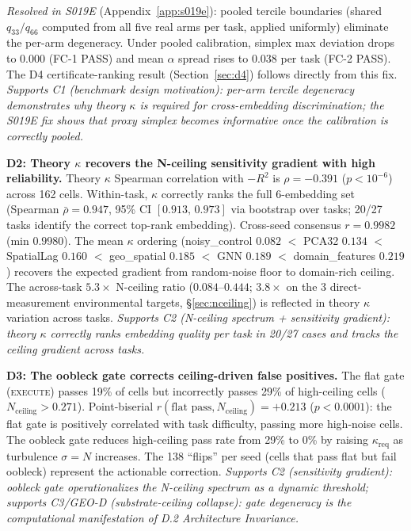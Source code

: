 \documentclass{article}
\begin{document}
\emph{Resolved in S019E} (Appendix~\ref{app:s019e}): pooled tercile boundaries (shared $q_{33}/q_{66}$ computed from all five real arms per task, applied uniformly) eliminate the per-arm degeneracy. Under pooled calibration, simplex max deviation drops to $0.000$ (FC-1 PASS) and mean $\alpha$ spread rises to $0.038$ per task (FC-2 PASS). The D4 certificate-ranking result (Section~\ref{sec:d4}) follows directly from this fix. \emph{Supports C1 (benchmark design motivation): per-arm tercile degeneracy demonstrates why theory $\kappa$ is required for cross-embedding discrimination; the S019E fix shows that proxy simplex becomes informative once the calibration is correctly pooled.}

\textbf{D2: Theory $\kappa$ recovers the N-ceiling sensitivity gradient with high reliability.}
Theory $\kappa$ Spearman correlation with $-R^2$ is $\rho = -0.391$ ($p < 10^{-6}$) across 162 cells. Within-task, $\kappa$ correctly ranks the full 6-embedding set (Spearman $\bar\rho = 0.947$, 95\% CI $[0.913,\, 0.973]$ via bootstrap over tasks; 20/27 tasks identify the correct top-rank embedding). Cross-seed consensus $r = 0.9982$ (min $0.9980$). The mean $\kappa$ ordering (noisy\_control $0.082$ $<$ PCA32 $0.134$ $<$ SpatialLag $0.160$ $<$ geo\_spatial $0.185$ $<$ GNN $0.189$ $<$ domain\_features $0.219$) recovers the expected gradient from random-noise floor to domain-rich ceiling. The across-task $5.3{\times}$ N-ceiling ratio ($0.084$--$0.444$; $3.8{\times}$ on the 3 direct-measurement environmental targets, \S\ref{sec:nceiling}) is reflected in theory $\kappa$ variation across tasks. \emph{Supports C2 (N-ceiling spectrum + sensitivity gradient): theory $\kappa$ correctly ranks embedding quality per task in 20/27 cases and tracks the ceiling gradient across tasks.}

\textbf{D3: The oobleck gate corrects ceiling-driven false positives.}
The flat gate (\textsc{execute}) passes 19\% of cells but incorrectly passes 29\% of high-ceiling cells ($N_{\text{ceiling}} > 0.271$). Point-biserial $r(\text{flat pass}, N_{\text{ceiling}}) = +0.213$ ($p < 0.0001$): the flat gate is positively correlated with task difficulty, passing more high-noise cells. The oobleck gate reduces high-ceiling pass rate from 29\% to 0\% by raising $\kappa_{\text{req}}$ as turbulence $\sigma = N$ increases. The 138 ``flips'' per seed (cells that pass flat but fail oobleck) represent the actionable correction. \emph{Supports C2 (sensitivity gradient): oobleck gate operationalizes the N-ceiling spectrum as a dynamic threshold; supports C3/GEO-D (substrate-ceiling collapse): gate degeneracy is the computational manifestation of D.2 Architecture Invariance.}
\end{document}
